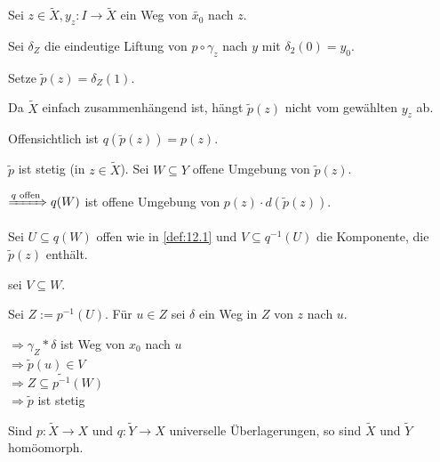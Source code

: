 \begin{beweis}
    Sei $z \in \tilde{X}, y_z: I \rightarrow \tilde{X}$ ein Weg von
    $\tilde{x_0}$ nach $z$.

    Sei $\delta_Z$ die eindeutige Liftung von $p \circ \gamma_z$
    nach $y$ mit $\delta_2(0) = y_0$.

    Setze $\tilde{p}(z) = \delta_Z(1)$.

    Da $\tilde{X}$ einfach zusammenhängend ist, hängt $\tilde{p}(z)$
    nicht vom gewählten $y_z$ ab.

    Offensichtlich ist $q(\tilde{p}(z)) = p(z)$.

    $\tilde{p}$ ist stetig (in $z \in \tilde{X}$). Sei $W \subseteq Y$
    offene Umgebung von $\tilde{p}(z)$.

    $\xRightarrow{q \text{ offen}} q(W)$ ist offene Umgebung von $p(z) \cdot d(\tilde{p}(z))$.

    Sei $U \subseteq q(W)$ offen wie in \cref{def:12.1} und
    $V \subseteq q^{-1}(U)$ die Komponente, die $\tilde{p}(z)$
    enthält.

    \Obda sei $V \subseteq W$.

    Sei $Z := p^{-1}(U)$. Für $u \in Z$ sei $\delta$ ein Weg in $Z$
    von $z$ nach $u$.

    $\Rightarrow \gamma_Z * \delta$ ist Weg von $x_0$ nach $u$\\
    $\Rightarrow \tilde{p}(u) \in V$\\
    $\Rightarrow Z \subseteq \tilde{p^{-1}}(W)$\\
    $\Rightarrow \tilde{p}$ ist stetig
\end{beweis}

\begin{folgerung}%
    Sind $p:\tilde{X} \rightarrow X$ und $q: \tilde{Y} \rightarrow X$
    universelle Überlagerungen, so sind $\tilde{X}$ und $\tilde{Y}$
    homöomorph.
\end{folgerung}


